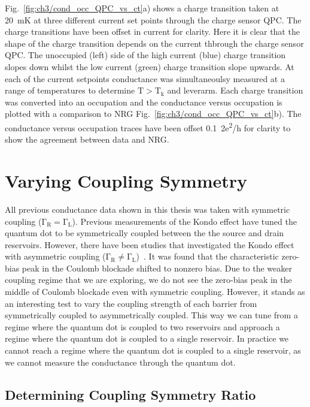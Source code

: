 Fig.~\ref{fig:ch3/cond_occ_QPC_vs_ct}a) shows a charge transition taken at \qty{20}{mK} at three different current set points through the charge sensor QPC. The charge transitions have been offset in current for clarity. Here it is clear that the shape of the charge transition depends on the current thbrough the charge sensor QPC. The unoccupied (left) side of the high current (blue) charge transition slopes down whilst the low current (green) charge transition slope upwards. At each of the current setpoints conductance was simultaneoulsy measured at a range of temperatures to determine $\mathrm{T>T_k}$ and leverarm. Each charge transition was converted into an occupation and the conductance versus occupation is plotted with a comparison to NRG Fig.~\ref{fig:ch3/cond_occ_QPC_vs_ct}b). The conductance versus occupation traces have been offset \qty{0.1}{2e^2/h} for clarity to show the agreement between data and NRG. 


\afterpage{\clearpage}
\section{Varying Coupling Symmetry}

All previous conductance data shown in this thesis was taken with symmetric coupling ($\mathrm{\Gamma_R = \Gamma_L}$). Previous measurements of the Kondo effect have tuned the quantum dot to be symmetrically coupled between the the source and drain reservoirs. However, there have been studies that investigated the Kondo effect with asymmetric coupling ($\mathrm{\Gamma_R \neq \Gamma_L}$)~\cite{kondo_asymmetric}. It was found that the characteristic zero-bias peak in the Coulomb blockade shifted to nonzero bias. Due to the weaker coupling regime that we are exploring, we do not see the zero-bias peak in the middle of Coulomb blockade even with symmetric coupling. However, it stands as an interesting test to vary the coupling strength of each barrier from symmetrically coupled to asymmetrically coupled. This way we can tune from a regime where the quantum dot is coupled to two reservoirs and approach a regime where the quantum dot is coupled to a single reservoir. In practice we cannot reach a regime where the quantum dot is coupled to a single reservoir, as we cannot measure the conductance through the quantum dot. 


\afterpage{\clearpage}
\subsection{Determining Coupling Symmetry Ratio}

